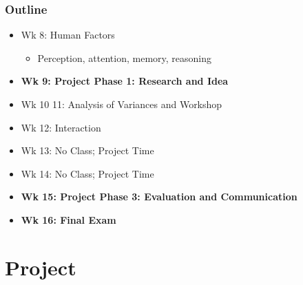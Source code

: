 \documentclass{beamer}
\begin{document}
\begin{frame}
	\frametitle{Outline}
	\begin{itemize}
		\item Wk 8: Human Factors
		\begin{itemize}
			\item Perception, attention, memory, reasoning
		\end{itemize}
		\item \textbf{Wk 9: Project Phase 1: Research and Idea}
		\item Wk 10 11: Analysis of Variances and Workshop
		\item Wk 12: Interaction
		\item Wk 13: No Class; Project Time
		\item Wk 14: No Class; Project Time
		\item \textbf{Wk 15: Project Phase 3: Evaluation and Communication}
		\item \textbf{Wk 16: Final Exam}
	\end{itemize}
\end{frame}

\section{Project} %
\end{document}
